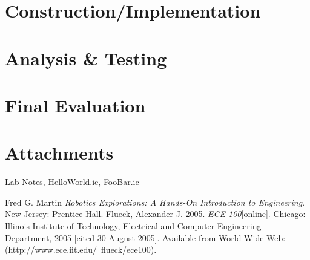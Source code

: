 \documentclass[a4paper, 11pt]{article}
\begin{document}
\section*{Construction/Implementation}
\lipsum[5]

\section*{Analysis \& Testing}
\lipsum[6]

\section*{Final Evaluation}
\lipsum[7]

\section*{Attachments}
Lab Notes, HelloWorld.ic, FooBar.ic

\begin{thebibliography}{9}
 Fred G. Martin \emph{Robotics Explorations: A Hands-On Introduction to Engineering}. New Jersey: Prentice Hall.
  Flueck, Alexander J. 2005. \emph{ECE 100}[online]. Chicago: Illinois Institute of Technology, Electrical and Computer Engineering Department, 2005 [cited 30
August 2005]. Available from World Wide Web: (http://www.ece.iit.edu/~flueck/ece100).
\end{thebibliography}
\end{document}

